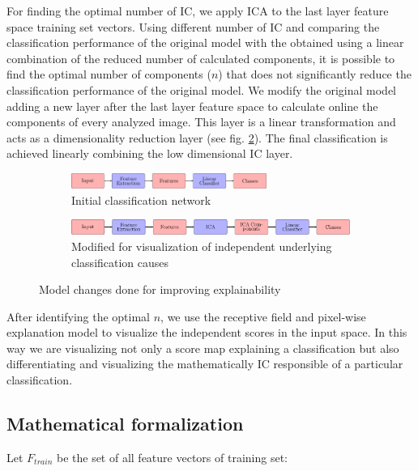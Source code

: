 \documentclass[preprint]{elsarticle}
\theoremstyle{definition} %
\theoremstyle{remark}
\begin{document}
For finding the optimal number of IC, we apply ICA to the last layer feature space training set vectors. Using different number of IC and comparing the classification performance of the original model with the obtained using a linear combination of the reduced number of calculated components, it is possible to find the optimal number of components ($n$) that does not significantly reduce the classification performance of the original model. We modify the original model adding a new layer after the last layer feature space to calculate online the components of every analyzed image. This layer is a linear transformation and acts as a dimensionality reduction layer (see fig. \ref{fig:models}). The final classification is achieved linearly combining the low dimensional IC layer. 

\begin{figure}[h!]
	\centering
	\begin{subfigure}[b]{\textwidth}
		\centering
		\includegraphics[width=0.7\textwidth]{figures/initial_classifier.pdf}
		\caption{Initial classification network}	
	\end{subfigure}
	\hfill   
	\begin{subfigure}[b]{\textwidth}
		\centering
		\includegraphics[width=\textwidth]{figures/ica_classifier.pdf}
		\caption{Modified for visualization of independent underlying classification causes}
		\label{fig:models_ica}
	\end{subfigure}
	\caption{Model changes done for improving explainability}  
	\label{fig:models} 
\end{figure}

After identifying the optimal $n$, we use the receptive field and pixel-wise explanation model \citep{de2017deep} to visualize the independent scores in the input space. In this way we are visualizing not only a score map explaining a classification but also differentiating and visualizing the mathematically IC responsible of a particular classification. 

\subsection{Mathematical formalization}

Let $F_{train}$ be the set of all feature vectors of training set:
\end{document}
